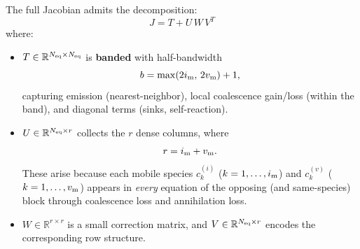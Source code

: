 \documentclass[11pt]{article}
\newcommand{\Neq}{N_{\rm eq}}
\newcommand{\im}{i_{\rm m}}
\newcommand{\vm}{v_{\rm m}}
\newcommand{\bw}{b}
\newcommand{\rank}{r}
\newcommand{\RR}{\mathbb{R}}
\begin{document}
The full Jacobian admits the decomposition:
\begin{equation}
  \boxed{J = T + U\,W\,V^{T}}
  \label{eq:bordered_banded}
\end{equation}
where:
\begin{itemize}
  \item $T \in \RR^{\Neq \times \Neq}$ is \textbf{banded} with
    half-bandwidth
    \begin{equation}
      \bw = \max(2\im, \,2\vm) + 1,
      \label{eq:bandwidth}
    \end{equation}
    capturing emission (nearest-neighbor), local coalescence
    gain/loss (within the band), and diagonal terms
    (sinks, self-reaction).

  \item $U \in \RR^{\Neq \times \rank}$ collects the $\rank$ dense
    columns, where
    \begin{equation}
      \rank = \im + \vm.
      \label{eq:rank}
    \end{equation}
    These arise because each mobile species $c_{k}^{(i)}$
    ($k = 1,\ldots,\im$) and $c_{k}^{(v)}$ ($k = 1,\ldots,\vm$)
    appears in \emph{every} equation of the opposing (and same-species)
    block through coalescence loss and annihilation loss.

  \item $W \in \RR^{\rank \times \rank}$ is a small correction
    matrix, and $V \in \RR^{\Neq \times \rank}$ encodes the
    corresponding row structure.
\end{itemize}
\end{document}
